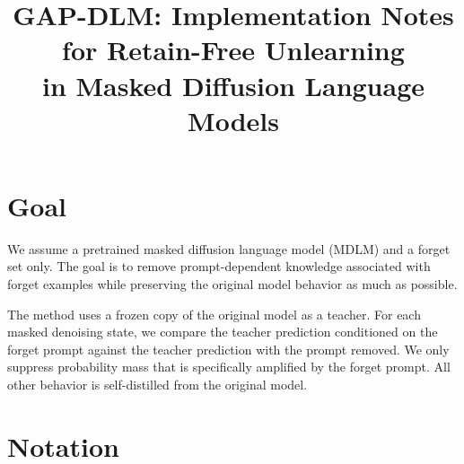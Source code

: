 \documentclass[10pt]{article}
\title{GAP-DLM: Implementation Notes for Retain-Free Unlearning\\
in Masked Diffusion Language Models}
\author{}
\date{}
\begin{document}
\maketitle

\section{Goal}

We assume a pretrained masked diffusion language model (MDLM) and a forget
set only. The goal is to remove prompt-dependent knowledge associated with
forget examples while preserving the original model behavior as much as possible.

The method uses a frozen copy of the original model as a teacher. For each
masked denoising state, we compare the teacher prediction conditioned on the
forget prompt against the teacher prediction with the prompt removed. We only
suppress probability mass that is specifically amplified by the forget prompt.
All other behavior is self-distilled from the original model.

\section{Notation}
\end{document}
